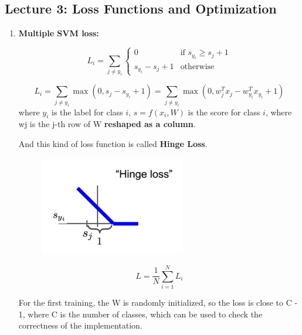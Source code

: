 \documentclass{article}
\numberwithin{equation}{section}
\begin{document}
\begin{CJK}{UTF8}{gbsn}
\newpage
\section*{Lecture 3: Loss Functions and Optimization}
\setcounter{section}{3}
\setcounter{equation}{0}

\begin{enumerate}
    \item \textbf{Multiple SVM loss:}\par
    \begin{equation*}
        L_i = \sum_{j \neq y_i} \begin{cases}
            0 & \text{if } s_{y_i} \geq s_j + 1 \\
            s_{y_i} - s_j + 1 & \text{otherwise } 
        \end{cases}
    \end{equation*}
    
    \begin{equation}\tag{SVM-Loss}
        L_i = \sum_{j \neq y_i} \max(0, s_j - s_{y_i} + 1) = \sum_{j \neq y_i} \max(0, w^T_j x_j - w^T_{y_i} x_{y_i} + 1)
    \end{equation}
    where \(y_i\) is the label for class \(i\), \(s = f(x_i, W)\) is the score for class \(i\), where wj
    is the j-th row of W \textbf{reshaped as a column}.\par

    And this kind of loss function is called \textbf{Hinge Loss}.\par
    \begin{figure}[h]
        \centering
        \includegraphics[width=0.6\textwidth]{images/Lecture3/Hinge_loss.png}
    \end{figure}

    \begin{equation}
        L = \frac{1}{N} \sum_{i=1}^{N} L_i
    \end{equation}

    For the first training, the W is randomly initialized, so the loss is close to C - 1, where C is the number of classes, which can be used to check the correctness of the implementation.\par


\end{enumerate}
\end{CJK}
\end{document}
